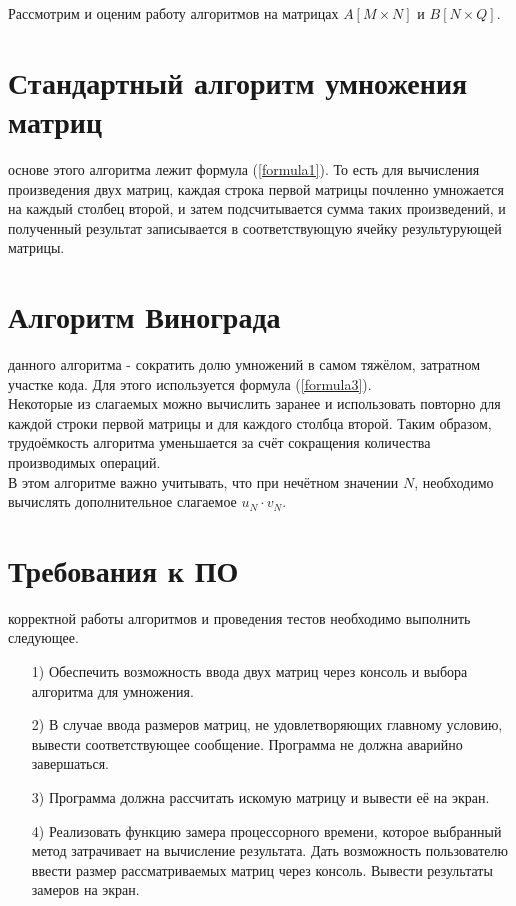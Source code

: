 Рассмотрим и оценим работу алгоритмов на матрицах $A[M \times N]$ и $B[N \times Q]$. 

\section{Стандартный алгоритм умножения матриц}
 основе этого алгоритма лежит формула (\ref{formula1}). То есть для вычисления произведения двух матриц, каждая строка первой матрицы почленно умножается на каждый столбец второй, и затем подсчитывается сумма таких произведений, и полученный результат записывается в соответствующую ячейку результурующей матрицы.

\section{Алгоритм Винограда}
 данного алгоритма - сократить долю умножений в самом тяжёлом, затратном участке кода. Для этого используется формула (\ref{formula3}).\\

Некоторые из слагаемых можно вычислить заранее и использовать повторно для каждой строки первой матрицы и для каждого столбца второй. Таким образом, трудоёмкость алгоритма уменьшается за счёт сокращения количества производимых операций.\\

В этом алгоритме важно учитывать, что при нечётном значении $N$, необходимо вычислять дополнительное слагаемое $u_N \cdot v_N$.

\section{Требования к ПО}
 корректной работы алгоритмов и проведения тестов необходимо выполнить следующее.
\begin{enumerate}
	\item[1)]Обеспечить возможность ввода двух матриц через консоль и выбора алгоритма для умножения.
	\item[2)]В случае ввода размеров матриц, не удовлетворяющих главному условию, вывести соответствующее сообщение. Программа не должна аварийно завершаться.
	\item[3)]Программа должна рассчитать искомую матрицу и вывести её на экран.
	\item[4)]Реализовать функцию замера процессорного времени, которое выбранный метод затрачивает на вычисление результата. Дать возможность пользователю ввести размер рассматриваемых матриц через консоль. Вывести результаты замеров на экран.
\end{enumerate}


